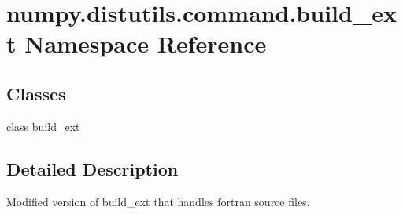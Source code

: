 \hypertarget{namespacenumpy_1_1distutils_1_1command_1_1build__ext}{}\section{numpy.\+distutils.\+command.\+build\+\_\+ext Namespace Reference}
\label{namespacenumpy_1_1distutils_1_1command_1_1build__ext}
\subsection*{Classes}
\begin{DoxyCompactItemize}
\item 
class \hyperlink{classnumpy_1_1distutils_1_1command_1_1build__ext_1_1build__ext}{build\+\_\+ext}
\end{DoxyCompactItemize}


\subsection{Detailed Description}
\begin{DoxyVerb}Modified version of build_ext that handles fortran source files.\end{DoxyVerb}
 